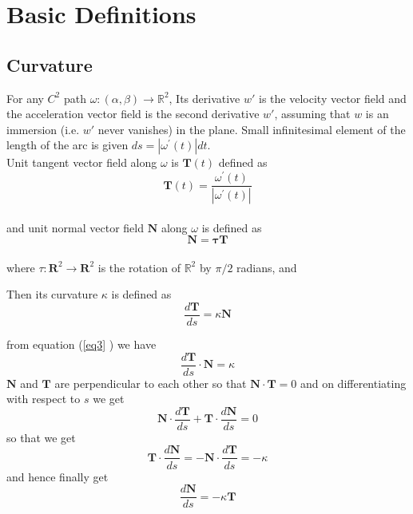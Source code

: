 \documentclass[oneside]{book}
\begin{document}
	\section{\textbf{Basic Definitions}}\label{s:1}
	\subsection{Curvature}
	\label{ss:1}
	
	For any $C^{2}$ path $\omega:(\alpha, \beta) \rightarrow \mathbb{R}^{2}$, Its derivative $w'$ is the velocity vector field  and the acceleration vector field is the second derivative  $w'$, assuming that $ w  $ is an immersion (i.e. $ w' $ never vanishes) in the plane. Small infinitesimal element of the length of the arc is given $d s=\left|\omega^{\prime}(t)\right| d t$.
	\\Unit tangent vector field along $\omega$ is $\mathbf{T}(t)$ defined as \\
	
	\begin{equation}
		\label{eq1}  
		\textbf{{T}}(t)=\frac{\omega^{\prime}(t)}{\left|\omega^{\prime}(t)\right|}
	\end{equation}  \\
	and unit normal vector field $\mathbf{N}$ along $\omega$ is defined as 
	\begin{equation}
		\label{eq2}  
		\mathbf{N}=\mathbf{\tau} \mathbf{T}
	\end{equation} \\
	where $ \tau: \mathbf{R}^{2} \rightarrow \mathbf{R}^{2}$ is the rotation of $\mathbb{R}^{2}$ by $\pi / 2$ radians, and
	
	Then its curvature $\kappa$ is defined as
	\begin{equation}
		\label{eq3}  
		\frac{d \mathbf{T}}{d s}=\kappa \mathbf{N}
	\end{equation}  
	
	from equation (\ref{eq3} ) we have
	$$ \frac{d \mathbf{T}}{d s} \cdot \mathbf{N} = \kappa $$
	$\mathbf{N}$ and $\mathbf{T}$ are perpendicular to each other so that $\mathbf{N} \cdot \mathbf{T} = 0 $
	and on differentiating with respect to $s$ we get 
	$$ \mathbf{N} \cdot \frac{d \mathbf{T}}{d s} + \mathbf{T} \cdot \frac{d \mathbf{N}}{d s} = 0 $$ 
	so that we get
	\hfill \break  
	$$ \mathbf{T} \cdot \frac{d \mathbf{N}}{d s} = -  \mathbf{N} \cdot \frac{d \mathbf{T}}{d s} = -\kappa  $$ 
	and hence finally get 
	\begin{equation}
		\label{eq4}  
		\frac{d \mathbf{N}}{d s}=-\kappa \mathbf{T}
	\end{equation}
	
\end{document}
